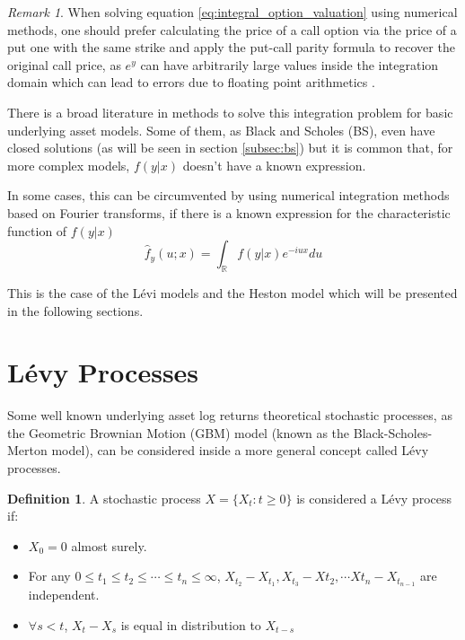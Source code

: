 \documentclass[12,twoside]{mammeTFM}
\theoremstyle{definition}
\newtheorem{definition}[thm]{Definition}
\theoremstyle{remark}
\newtheorem{remark}[thm]{Remark}
\newcommand{\R}{\ensuremath{\mathbb{R}}}
\begin{document}
\begin{remark}
When solving equation \ref{eq:integral_option_valuation} using numerical methods, one should prefer calculating the price of a call option via the price of a put one with the same strike and apply the put-call parity formula to recover the original call price, as $e^y$ can have arbitrarily large values inside the integration domain which can lead to errors due to floating point arithmetics \cite{mar17}.
\end{remark}

There is a broad literature in methods to solve this integration problem for basic underlying asset models. Some of them, as Black and Scholes (BS), even have closed solutions (as will be seen in section \ref{subsec:bs}) but it is common that, for more complex models, $f(y|x)$ doesn't have a known expression.

In some cases, this can be circumvented by using numerical integration methods based on Fourier transforms, if there is a known expression for the characteristic function of $f(y|x)$
\begin{equation}
\hat{f}_y(u;x) = \int_{\R} f(y | x) e^{-iux} du
\end{equation}

This is the case of the L\'evi models and the Heston model which will be presented in the following sections.

\section{L\'evy Processes}
Some well known underlying asset log returns theoretical stochastic processes, as the Geometric Brownian Motion (GBM) model (known as the Black-Scholes-Merton\cite{bs73, mer73} model), can be considered inside a more general concept called L\'evy processes.

\begin{definition} A stochastic process $X = \{X_t : t \geq 0\}$ is considered a L\'evy process if:
\begin{itemize}
\item $X_0 = 0$ almost surely.
\item For any $0 \leq t_1 \leq t_2 \leq \cdots \leq t_n \leq \infty$, $X_{t_2} - X_{t_1}, X_{t_3} - X{t_2}, \cdots X{t_n} - X_{t_{n-1}}$ are independent.
\item $\forall s < t$, $X_t - X_s$ is equal in distribution to $X_{t-s}$
\end{itemize}
\end{definition}
\end{document}
